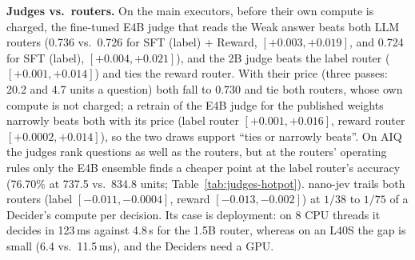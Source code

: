 \documentclass{article}
\begin{document}
\textbf{Judges vs.\ routers.} On the main executors, before their own compute is charged, the fine-tuned E4B judge that reads the Weak answer beats both LLM routers (0.736 vs.\ 0.726 for SFT (label) + Reward, $[+0.003, +0.019]$, and 0.724 for SFT (label), $[+0.004, +0.021]$), and the 2B judge beats the label router ($[+0.001, +0.014]$) and ties the reward router. With their price (three passes: 20.2 and 4.7 units a question) both fall to 0.730 and tie both routers, whose own compute is not charged; a retrain of the E4B judge for the published weights narrowly beats both with its price (label router $[+0.001, +0.016]$, reward router $[+0.0002, +0.014]$), so the two draws support ``ties or narrowly beats''. On AIQ the judges rank questions as well as the routers, but at the routers' operating rules only the E4B ensemble finds a cheaper point at the label router's accuracy (76.70\% at 737.5 vs.\ 834.8 units; Table~\ref{tab:judges-hotpot}). nano-jev trails both routers (label $[-0.011, -0.0004]$, reward $[-0.013, -0.002]$) at $1/38$ to $1/75$ of a Decider's compute per decision. Its case is deployment: on 8 CPU threads it decides in 123\,ms against 4.8\,s for the 1.5B router, whereas on an L40S the gap is small (6.4 vs.\ 11.5\,ms), and the Deciders need a GPU.
\end{document}
